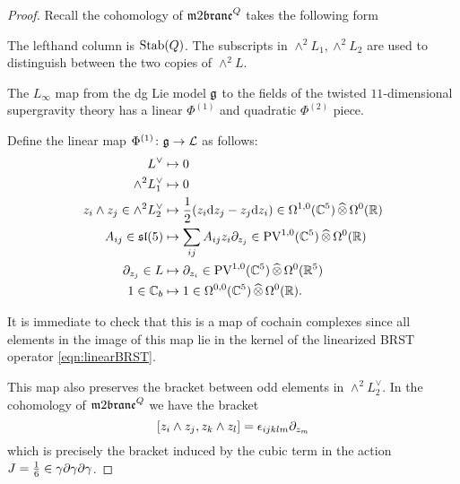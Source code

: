 \begin{proof}
Recall the cohomology of $\m2^Q$ takes the following form
\beqn 
{}
\eeqn
The lefthand column is ${\rm Stab}(Q)$. 
The subscripts in $\wedge^2 L_1, \wedge^2 L_2$ are used to distinguish between the two copies of $\wedge^2 L$.

The $L_\infty$ map from the dg Lie model $\mathfrak g$ to the fields of the twisted $11$-dimensional supergravity theory has a linear $\Phi^{(1)}$ and quadratic $\Phi^{(2)}$ piece.

Define the linear map $\Phi^{(1)} \colon \mathfrak g \to \mathcal L$ as follows:
\begin{align*}
 L^\vee & \mapsto 0 \\
 \wedge^2 L_1^\vee  & \mapsto 0 \\
z_i \wedge z_j \in \wedge^2 L^\vee_2 & \mapsto \frac12 (z_i \d z_j - z_j \d z_i) \in \Omega^{1,0} (\CC^5) \hotimes \Omega^0 (\RR) \\
A_{ij} \in \lie{sl}(5) & \mapsto \sum_{ij} A_{ij} z_i \partial_{z_j} \in \PV^{1,0}(\CC^5) \hotimes \Omega^0(\RR) \\ \partial_{z_j} \in L & \mapsto
\partial_{z_i} \in \PV^{1,0} (\CC^5) \hotimes \Omega^0 (\RR^5) \\ %
1 \in \CC_b & \mapsto 1 \in \Omega^{0,0}(\CC^5) \hotimes \Omega^0 (\RR) .
\end{align*}

It is immediate to check that this is a map of cochain complexes since all elements in the image of this map lie in the kernel of the linearized BRST operator \eqref{eqn:linearBRST}. 

This map also preserves the bracket between odd elements in $\wedge^2 L_2^\vee$. 
In the cohomology of $\m2^Q$ we have the bracket
\[
[z_i\wedge z_j , z_k \wedge z_l] = \epsilon_{ijklm} \partial_{z_m}
\]
which is precisely the bracket induced by the cubic term in the action $J = \frac16 \in \gamma \partial \gamma \partial \gamma$. 


\end{proof}
